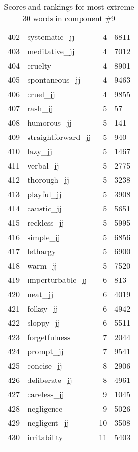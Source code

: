 \begin{longtable}[!htbp]{| rlr@{.}l |}
    402 & systematic\_jj & 4 & 6811 \\
    403 & meditative\_jj & 4 & 7012 \\
    404 & cruelty & 4 & 8901 \\
    405 & spontaneous\_jj & 4 & 9463 \\
    406 & cruel\_jj & 4 & 9855 \\
    407 & rash\_jj & 5 & 57 \\
    408 & humorous\_jj & 5 & 141 \\
    409 & straightforward\_jj & 5 & 940 \\
    410 & lazy\_jj & 5 & 1467 \\
    411 & verbal\_jj & 5 & 2775 \\
    412 & thorough\_jj & 5 & 3238 \\
    413 & playful\_jj & 5 & 3908 \\
    414 & caustic\_jj & 5 & 5651 \\
    415 & reckless\_jj & 5 & 5995 \\
    416 & simple\_jj & 5 & 6856 \\
    417 & lethargy & 5 & 6900 \\
    418 & warm\_jj & 5 & 7520 \\
    419 & imperturbable\_jj & 6 & 813 \\
    420 & neat\_jj & 6 & 4019 \\
    421 & folksy\_jj & 6 & 4942 \\
    422 & sloppy\_jj & 6 & 5511 \\
    423 & forgetfulness & 7 & 2044 \\
    424 & prompt\_jj & 7 & 9541 \\
    425 & concise\_jj & 8 & 2906 \\
    426 & deliberate\_jj & 8 & 4961 \\
    427 & careless\_jj & 9 & 1045 \\
    428 & negligence & 9 & 5026 \\
    429 & negligent\_jj & 10 & 3508 \\
    430 & irritability & 11 & 5403 \\
    \hline
    \caption{Scores and rankings for most extreme 30 words in component \#9} \\
\end{longtable}
